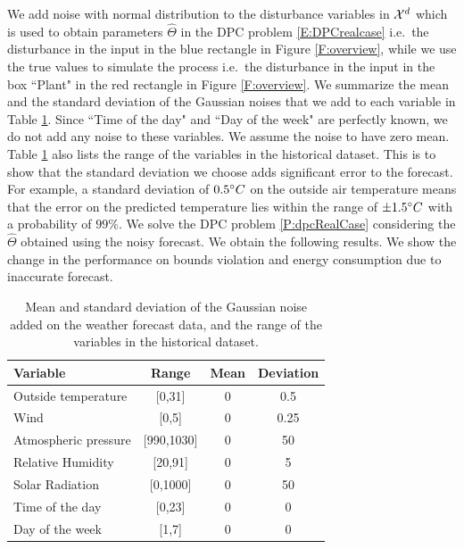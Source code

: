 \textcolor[rgb]{0,0,1}{We add noise with normal distribution to the disturbance variables in $\mathcal{X}^d$ which is used to obtain parameters $\hat \Theta$ in the DPC problem \eqref{E:DPCrealcase} i.e.~the disturbance in the input in the blue rectangle in Figure \ref{F:overview}, while we use the true values to simulate the process i.e.~the disturbance in the input in the box ``Plant" in the red rectangle in Figure \ref{F:overview}.
We summarize the mean and the standard deviation of the Gaussian noises that we add to each variable in Table \ref{T:NoiseParameters}.
Since ``Time of the day" and ``Day of the week" are perfectly known, we do not add any noise to these variables.
We assume the noise to have zero mean.
Table \ref{T:NoiseParameters} also lists the range of the variables in the historical dataset.
This is to show that the standard deviation we choose adds significant error to the forecast.
For example, a standard deviation of $0.5\degree C$ on the outside air temperature means that the error on the predicted temperature lies within the range of $\pm 1.5\degree C$ with a probability of $99\%$.
We solve the DPC problem \ref{P:dpcRealCase} considering the $\hat \Theta$ obtained using the noisy forecast.
We obtain the following results. We show the change in the performance on bounds violation and energy consumption due to inaccurate forecast.}
\begin{table}[t!]
	\centering	
	\textcolor[rgb]{0,0,1}{\begin{tabular}{lccc}
		\toprule
		Variable               & Range      & Mean & Deviation \\ 
		\midrule
		Outside temperature    & [0,31]     & 0	   & 0.5       \\
		Wind                   & [0,5] 		& 0    & 0.25      \\
		Atmospheric pressure   & [990,1030] & 0    & 50        \\
		Relative Humidity      & [20,91]	& 0    & 5         \\
		Solar Radiation        & [0,1000]   & 0    & 50        \\
		Time of the day        & [0,23]     & 0    & 0         \\
		Day of the week        & [1,7]      & 0    & 0         \\
		\bottomrule
	\end{tabular}}
	\caption{\textcolor[rgb]{0,0,1}{Mean and standard deviation of the Gaussian noise added on the weather forecast data, and the range of the variables in the historical dataset.}}
	\captionsetup{justification=centering}
	\label{T:NoiseParameters}
\end{table}

